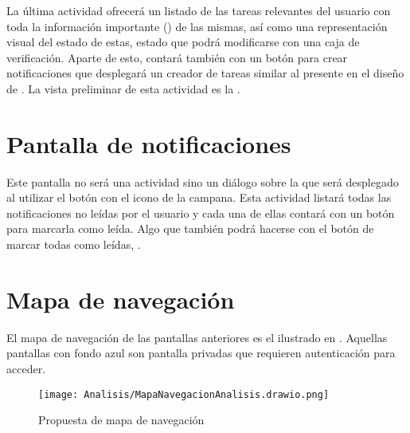 La última actividad ofrecerá un listado de las tareas relevantes del usuario con toda la información importante () de las mismas, así como una representación visual del estado de estas, estado que podrá modificarse con una caja de verificación. Aparte de esto, contará también con un botón para crear notificaciones que desplegará un creador de tareas similar al presente en el diseño de . La vista preliminar de esta actividad es la .

\section{Pantalla de notificaciones}
\label{sec:pantalla_notificaciones}

Este pantalla no será una actividad sino un diálogo sobre la  que será desplegado al utilizar el botón con el icono de la campana. Esta actividad listará todas las notificaciones no leídas por el usuario y cada una de ellas contará con un botón para marcarla como leída. Algo que también podrá hacerse con el botón de marcar todas como leídas, .

\section{Mapa de navegación}

El mapa de navegación de las pantallas anteriores es el ilustrado en . Aquellas pantallas con fondo azul son pantalla privadas que requieren autenticación para acceder.

\begin{figure}[H]
    \centering
    \texttt{[image: Analisis/MapaNavegacionAnalisis.drawio.png]}
    \caption{Propuesta de mapa de navegación}
    \label{fig:ui:navegacion}
\end{figure}